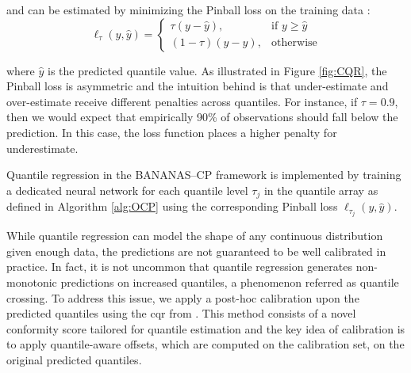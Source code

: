 {\begin{description}[leftmargin=0cm, listparindent=\parindent]
	\noindent and can be estimated by minimizing the Pinball loss on the training data \cite{koenker1978regression}:
		\begin{equation}
			\ell_\tau(y, \hat{y}) = 
			\begin{cases}
			\tau (y - \hat{y}), & \text{if } y \geq \hat{y} \\
			(1 - \tau)(\hat{y} - y), & \text{otherwise}
			\end{cases}
		\label{pinballloss}
		\end{equation}
		
	\noindent where $\hat{y}$ is the predicted quantile value.	 As illustrated in Figure \ref{fig:CQR}, the Pinball loss is asymmetric and the intuition behind is that under-estimate and over-estimate receive different penalties across quantiles. 	For instance, if $\tau=0.9$, then we would expect that empirically 90\% of observations should fall below the prediction. In this case, the loss function places a higher penalty for underestimate.	
	
	Quantile regression in the BANANAS--CP framework is implemented by training a dedicated neural network for each quantile level $\tau_j$ in the quantile array as defined in Algorithm \ref{alg:OCP} using the corresponding Pinball loss $\ell_{\tau_j}(y, \hat{y})$. 
	
	 While quantile regression can model the shape of any continuous distribution given enough data, the predictions are not guaranteed to be well calibrated in practice. In fact, it is not uncommon that quantile regression generates non-monotonic predictions on increased quantiles, a phenomenon referred as quantile crossing. To address this issue, we apply a post-hoc calibration upon the predicted quantiles using the \gls{cqr} from \cite{romano2019conformalized}. This method consists of a novel conformity score tailored for quantile estimation and the key idea of calibration is to apply quantile-aware offsets, which are computed on the calibration set, on the original predicted quantiles.
	 

\end{description}}

